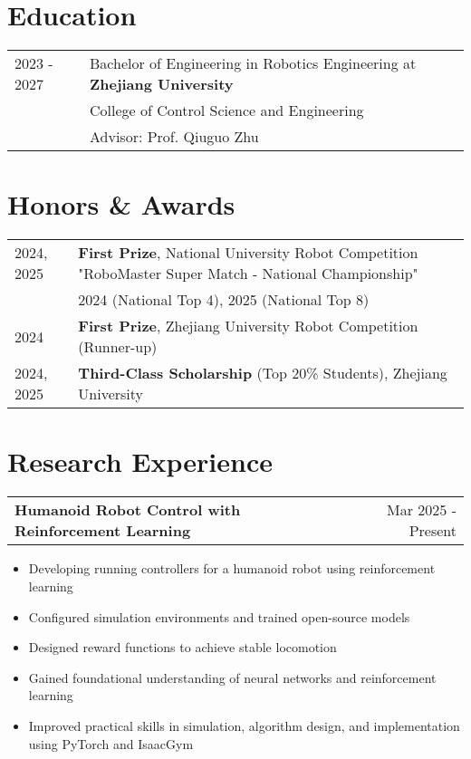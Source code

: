 \documentclass[a4paper,12pt]{article}
\makeatletter
\newenvironment{joblong}[2]
    {
    \begin{tabularx}{\linewidth}{@{}l X r@{}}
    \textbf{#1} & \hfill &  #2 \\[3.75pt]
    \end{tabularx}
    \begin{minipage}[t]{\linewidth}
    \begin{itemize}[nosep,after=\strut, leftmargin=1em, itemsep=3pt,label=--]
    }
    {
    \end{itemize}
    \end{minipage}    
    }
\makeatother
\begin{document}
\section{Education}
\begin{tabularx}{\linewidth}{@{}l X@{}}	
2023 - 2027 & Bachelor of Engineering in Robotics Engineering at \textbf{Zhejiang University} \hfill \normalsize \\
& College of Control Science and Engineering \\
& Advisor: Prof. Qiuguo Zhu \\
\end{tabularx}

\section{Honors \& Awards}
\begin{tabularx}{\linewidth}{@{}l X@{}}
2024, 2025 & \textbf{First Prize}, National University Robot Competition "RoboMaster Super Match - National Championship" \\
& 2024 (National Top 4), 2025 (National Top 8) \\[3.75pt]
2024 & \textbf{First Prize}, Zhejiang University Robot Competition (Runner-up) \\[3.75pt]
2024, 2025 & \textbf{Third-Class Scholarship} (Top 20\% Students), Zhejiang University \\
\end{tabularx}

\section{Research Experience}

\begin{joblong}{Humanoid Robot Control with Reinforcement Learning}{Mar 2025 - Present}
\item Developing running controllers for a humanoid robot using reinforcement learning
\item Configured simulation environments and trained open-source models
\item Designed reward functions to achieve stable locomotion
\item Gained foundational understanding of neural networks and reinforcement learning
\item Improved practical skills in simulation, algorithm design, and implementation using PyTorch and IsaacGym
\end{joblong}
\end{document}
